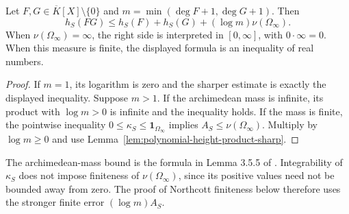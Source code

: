 \begin{lemma}
\label{lem:polynomial-height-product}
\leanok
Let $F,G\in\overline K[X]\setminus\{0\}$ and
$m=\min(\deg F+1,\deg G+1)$. Then
\[
 h_S(FG)\leq h_S(F)+h_S(G)+(\log m)\nu(\Omega_\infty).
\]
When $\nu(\Omega_\infty)=\infty$, the right side is interpreted
in $[0,\infty]$, with $0\cdot\infty=0$. When this measure is finite,
the displayed formula is an inequality of real numbers.
\end{lemma}
\begin{proof}
If $m=1$, its logarithm is zero and the sharper estimate is exactly
the displayed inequality. Suppose $m>1$. If the archimedean mass is
infinite, its product with $\log m>0$ is infinite and the inequality
holds. If the mass is finite, the pointwise inequality
$0\leq\kappa_S\leq\mathbf1_{\Omega_\infty}$ implies
$A_S\leq\nu(\Omega_\infty)$. Multiply by $\log m\geq0$ and use
Lemma~\ref{lem:polynomial-height-product-sharp}.
\end{proof}

\begin{remark}
\label{rem:northcott-archimedean-error}
The archimedean-mass bound is the formula in Lemma 3.5.5 of
\cite{chen-moriwaki}. Integrability of $\kappa_S$ does not impose
finiteness of $\nu(\Omega_\infty)$, since its positive values need
not be bounded away from zero. The proof of Northcott finiteness
below therefore uses the stronger finite error $(\log m)A_S$.
\end{remark}

